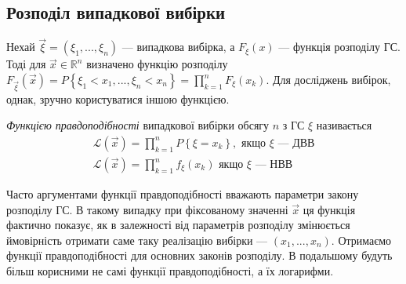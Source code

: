 \subsection{Розподіл випадкової вибірки}
Нехай $\vec{\xi} = \left( \xi_1, ..., \xi_n\right)$ --- випадкова вибірка, а $F_{\xi}(x)$ --- функція розподілу ГС. Тоді для 
$\vec{x} \in \mathbb{R}^n$ визначено функцію розподілу 
$F_{\vec{\xi}}(\vec{x}) = P\left\{\xi_1 < x_1, ..., \xi_n < x_n \right\} = \prod\limits_{k=1}^n F_{\xi}(x_k)$. Для досліджень вибірок, однак,
зручно користуватися іншою функцією.
\begin{definition}
    \emph{Функцією правдоподібності} випадкової вибірки обсягу $n$ з ГС $\xi$ називається 
    \begin{gather}
        \mathcal{L}(\vec{x}) = \prod\limits_{k=1}^n P\left\{ \xi = x_k\right\}, \text{ якщо } \xi \text{ --- ДВВ} \\
        \mathcal{L}(\vec{x}) = \prod\limits_{k=1}^n f_{\xi}(x_k) \text{ якщо } \xi \text{ --- НВВ}
    \end{gather}
\end{definition}
Часто аргументами функції правдоподібності вважають параметри закону розподілу ГС. В такому випадку при фіксованому значенні
$\vec{x}$ ця функція фактично показує, як в залежності від параметрів розподілу змінюється ймовірність отримати саме таку реалізацію
вибірки --- $\left(x_1, ..., x_n \right)$.
Отримаємо функції правдоподібності для основних законів розподілу. В подальшому будуть більш корисними не самі функції правдоподібності,
а їх логарифми.
